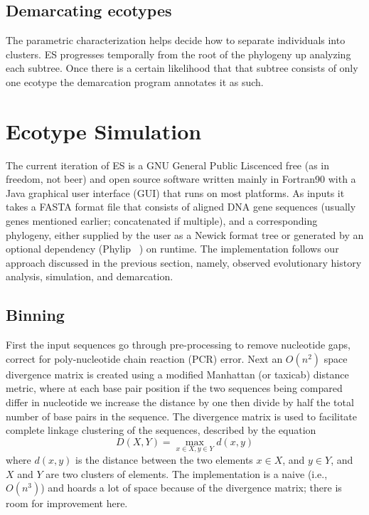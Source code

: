 \subsection*{Demarcating ecotypes}
The parametric characterization helps decide how to separate individuals into clusters.
ES progresses temporally from the root of the phylogeny up analyzing each subtree.
Once there is a certain likelihood that that subtree consists of only one ecotype the demarcation program annotates it as such.


\section{Ecotype Simulation}
%
%
The current iteration of ES is a GNU General Public Liscenced free (as in freedom, not beer) and open source software written mainly in Fortran90 with a Java graphical user interface (GUI) that runs on most platforms.
As inputs it takes a FASTA format file that consists of aligned DNA gene sequences (usually genes mentioned earlier; concatenated if multiple), and a corresponding phylogeny, either supplied by the user as a Newick format tree or generated by an optional dependency (Phylip ~\cite{felsenstein1989phylip}) on runtime.
The implementation follows our approach discussed in the previous section, namely, observed evolutionary history analysis, simulation, and demarcation.

\subsection*{Binning}
First the input sequences go through pre-processing to remove nucleotide gaps, correct for poly-nucleotide chain reaction (PCR) error.
Next an $O(n^2)$ space divergence matrix is created using a modified Manhattan (or taxicab) distance metric, where at each base pair position if the two sequences being compared differ in nucleotide we increase the distance by one then divide by half the total number of base pairs in the sequence.
The divergence matrix is used to facilitate complete linkage clustering of the sequences, described by the equation $$D(X,Y)= \max_{x\in X, y\in Y} d(x,y)$$ where $d(x,y)$ is the distance between the two elements $x \in X$, and $y \in Y$, and $X$ and $Y$ are two clusters of elements.
The implementation is a naive (i.e., $O(n^3)$) and hoards a lot of space because of the divergence matrix; there is room for improvement here. 

